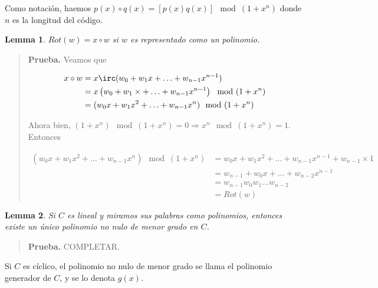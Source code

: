 \documentclass[a4paper]{article}
\newtheorem{lemma}{Lemma}
\newtheorem{lemma}{Lemma}
\begin{document}
Como notación, haemos $p(x) \circ q(x) = \left[ p(x) q(x) \right] \mod (1 + x^n)$
donde $n$ es la longitud del código.

\begin{lemma}
    $Rot(w) = x \circ w$ si $w$ es representado como un polinomio.
\end{lemma}


\small
\begin{quote}

\textbf{Prueba.} Veamos que 

\begin{align*}
    x \circ w &= x \irc (w_0 + w_1x + \ldots + w_{n-1}x^{n-1}) \\ 
              &=x \left( w_0 + w_1\times  + \ldots + w_{n-1}x^{n-1} \right) \mod (1 + x^n) \\ 
              &= (w_0 x + w_1x^2 + \ldots + w_{n-1}x^n) \mod (1 + x^n)
\end{align*}

Ahora bien, $(1+x^n) \mod (1 + x^n) = 0 \Rightarrow x^n \mod (1 + x^n) = 1$. Entonces 

\begin{align*}
    
    (w_0 x + w_1x^2 + \ldots + w_{n-1}x^n) \mod (1 + x^n) &= w_0 x + w_1x^2 + \ldots + w_{n-1}x^{n-1} + w_{n-1} \times 1 \\ 
                                                          &=w_{n-1} + w_0 x + \ldots + w_{n-2} x^{n-1} \\ 
                                                          &= w_{n-1} w_0 w_1 \ldots w_{n-2} \\ 
                                                        &= Rot(w)
\end{align*}

\end{quote}
\normalsize


\begin{lemma}
    Si $C$ es lineal y miramos sus palabras como polinomios, entonces existe un 
    único polinomio no nulo de menor grado en $C$.
\end{lemma}



\small
\begin{quote}

\textbf{Prueba.} COMPLETAR.

\end{quote}
\normalsize

\begin{definition}
    Si $C$ es cíclico, el polinomio no nulo de menor grado se llama 
    el polinomio generador de $C$, y se lo denota $g(x)$.
\end{definition}
\end{document}
